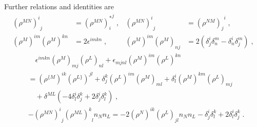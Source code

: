 %
%
Further relations and identities are
%
%
\begin{align}
{\left(\rho^{MN}\right)^{i}}_{j} &= {\left(\rho^{MN}\right)^{*}_{i}}^{j}\;, & {\left(\rho^{MN}\right)^{i}}_{j} &= {\left(\rho^{NM}\right)_{j}}^{i}\;,
\label{eq: SO6_id} \\
 (\rho^M)^{im} (\rho^M)^{kn}&=2\epsilon^{imkn}\;, &  (\rho^M)^{im} (\rho^M)_{nj}&=2\left(\delta^i_j \delta^m_n -\delta^i_n \delta^m_j\right)\;,
\end{align}
%
%
\begin{align}
 &\quad \epsilon^{imkn} (\rho^M)_{mj}(\rho^L)_{nl}+\epsilon_{mjnl}(\rho^M)^{im}(\rho^L)^{kn}\\
 &=(\rho^{\{M})^{ik}(\rho^{L\}})^{jl}+\delta^k_j(\rho^L)^{im}(\rho^M)_{ml}+\delta^i_l(\rho^M)^{km}(\rho^L)_{mj}\nonumber \\
 &\quad+\delta^{ML}\left(-4\delta^i_l \delta^k_j +2\delta^i_j\delta^k_l\right)\;,\nonumber\\[0.4cm]
& -{(\rho^{MN})^i}_j {(\rho^{ML})^k}_l n_N n_L=-2(\rho^{N})^{ik} (\rho^{L})_{jl} n_N n_L-\delta^i_j \delta^k_l+2\delta^i_l \delta^k_j \;.
\end{align}
%
%
%
%
%
%
%
